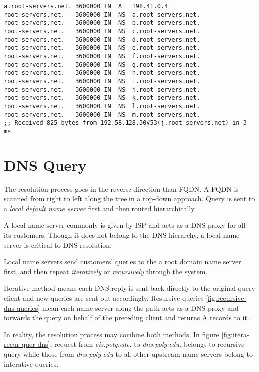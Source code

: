 \begin{minipage}{1.0\linewidth}
\begin{lstlisting}[caption={A RR in Root Name Server},label={lst:root-a-rr},basicstyle=\tiny\ttfamily]
a.root-servers.net.	3600000	IN	A	198.41.0.4
root-servers.net.	3600000	IN	NS	a.root-servers.net.
root-servers.net.	3600000	IN	NS	b.root-servers.net.
root-servers.net.	3600000	IN	NS	c.root-servers.net.
root-servers.net.	3600000	IN	NS	d.root-servers.net.
root-servers.net.	3600000	IN	NS	e.root-servers.net.
root-servers.net.	3600000	IN	NS	f.root-servers.net.
root-servers.net.	3600000	IN	NS	g.root-servers.net.
root-servers.net.	3600000	IN	NS	h.root-servers.net.
root-servers.net.	3600000	IN	NS	i.root-servers.net.
root-servers.net.	3600000	IN	NS	j.root-servers.net.
root-servers.net.	3600000	IN	NS	k.root-servers.net.
root-servers.net.	3600000	IN	NS	l.root-servers.net.
root-servers.net.	3600000	IN	NS	m.root-servers.net.
;; Received 825 bytes from 192.58.128.30#53(j.root-servers.net) in 3 ms
\end{lstlisting}
\end{minipage}

\section{DNS Query}
\label{sec:dns-query}

The resolution process goes in the reverse direction than FQDN. A
FQDN is scanned from right to left along the tree in a top-down
approach. Query is sent to a \textit{local default name server}
first and then routed hierarchically.

A local name server commonly is given by ISP and acts as a DNS
proxy for all its customers. Though it does not belong to the DNS
hierarchy, a local name server is critical to DNS resolution.

Local name servers send customers' queries to the a root domain
name server first, and then repeat \textit{iteratively} or
\textit{recursively} through the system.

Iterative method means each DNS reply is sent back directly to the
original query client and new queries are sent out
accordingly. Resursive queries \ref{fig:recursive-dns-queries}
mean each name server along the path acts as a DNS proxy and
forwards the query on behalf of the preceding client and returns A
records to it.

In reality, the resolution process may combine both methods. In
figure \ref{fig:itera-recur-quer-dns}, request from
\textit{cis.poly.edu.} to \textit{dns.poly.edu.} belongs to
recursive query while those from \textit{dns.poly.edu} to all
other upstream name servers belong to interative queries.

